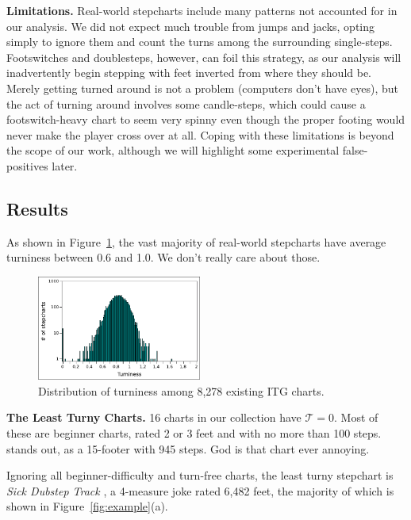 \documentclass[10pt]{sigplanconf}
\begin{document}
{\bf Limitations.}
Real-world stepcharts include many patterns not accounted for in our analysis. We did not expect much trouble from jumps and jacks, opting simply to ignore them and count the turns among the surrounding single-steps.
Footswitches and doublesteps, however, can foil this strategy, as our analysis will inadvertently begin stepping with feet inverted from where they should be.
Merely getting turned around is not a problem (computers don't have eyes), but the act of turning around involves some candle-steps, which could cause a footswitch-heavy chart to seem very spinny even though the proper footing would never make the player cross over at all.
Coping with these limitations is beyond the scope of our work, although we will highlight some experimental false-positives later.

\subsection{Results}

As shown in Figure~\ref{fig:distribution}, the vast majority of real-world stepcharts have average turniness between 0.6 and 1.0.
We don't really care about those.

\begin{figure}[t]
	\begin{center}
	\includegraphics[width=0.48\textwidth]{realworld.pdf}
	\end{center}
	\caption{Distribution of turniness among 8,278 existing ITG charts.}
	\label{fig:distribution}
\end{figure}

{\bf The Least Turny Charts.}
16 charts in our collection have $\mathcal{T}=0$. Most of these are beginner charts, rated 2 or 3 feet and with no more than 100 steps. \cite{deltamax} stands out, as a 15-footer with 945 steps. God is that chart ever annoying.

Ignoring all beginner-difficulty and turn-free charts, the least turny stepchart is {\em Sick Dubstep Track} \cite{sickdubstep}, a 4-measure joke rated 6,482 feet, the majority of which is shown in Figure~\ref{fig:example}(a).
\end{document}
